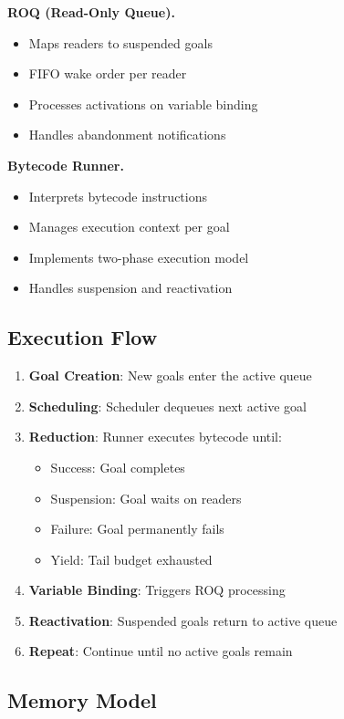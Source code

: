 \documentclass[runningheads,thm-restate]{llncs}
\newcommand{\mypara}[1]{\smallskip\noindent\textbf{#1.}}
\begin{document}
\mypara{ROQ (Read-Only Queue)}
\begin{itemize}
\item Maps readers to suspended goals
\item FIFO wake order per reader
\item Processes activations on variable binding
\item Handles abandonment notifications
\end{itemize}

\mypara{Bytecode Runner}
\begin{itemize}
\item Interprets bytecode instructions
\item Manages execution context per goal
\item Implements two-phase execution model
\item Handles suspension and reactivation
\end{itemize}

\subsection{Execution Flow}

\begin{enumerate}
\item \textbf{Goal Creation}: New goals enter the active queue
\item \textbf{Scheduling}: Scheduler dequeues next active goal
\item \textbf{Reduction}: Runner executes bytecode until:
   \begin{itemize}
   \item Success: Goal completes
   \item Suspension: Goal waits on readers
   \item Failure: Goal permanently fails
   \item Yield: Tail budget exhausted
   \end{itemize}
\item \textbf{Variable Binding}: Triggers ROQ processing
\item \textbf{Reactivation}: Suspended goals return to active queue
\item \textbf{Repeat}: Continue until no active goals remain
\end{enumerate}

\subsection{Memory Model}
\end{document}
